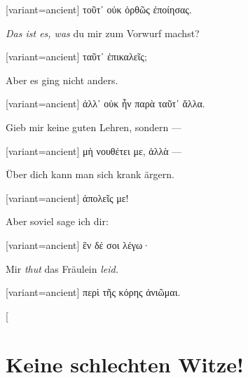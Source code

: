 \switchcolumn

\begin{greek}[variant=ancient]%
τοῦτ᾽ οὐκ ὀρθῶς ἐποίησας.

\end{greek}%
\switchcolumn*

\emph{Das ist es, was} du mir zum Vorwurf machst?

\switchcolumn

\begin{greek}[variant=ancient]%
ταῦτ᾽ ἐπικαλεῖς;

\end{greek}%
\switchcolumn*

Aber es ging nicht anders. 

\switchcolumn

\begin{greek}[variant=ancient]%
ἀλλ᾽ οὐκ ἦν παρὰ ταῦτ᾽ ἄλλα.

\end{greek}%
\switchcolumn*

Gieb mir keine guten Lehren, sondern — 

\switchcolumn

\begin{greek}[variant=ancient]%
μὴ νουθέτει με, ἀλλὰ —

\end{greek}%
\switchcolumn*

Über dich kann man sich krank ärgern. 

\switchcolumn

\begin{greek}[variant=ancient]%
ἀπολεῖς με!

\end{greek}%
\switchcolumn*

Aber soviel sage ich dir: 

\switchcolumn

\begin{greek}[variant=ancient]%
ἓν δέ σοι λέγω·

\end{greek}%
\switchcolumn*

Mir \emph{thut} das Fräulein \emph{leid.}

\switchcolumn

\begin{greek}[variant=ancient]%
περὶ τῆς κόρης ἀνιῶμαι.

\end{greek}%
\switchcolumn*[


\section{Keine schlechten Witze!}

